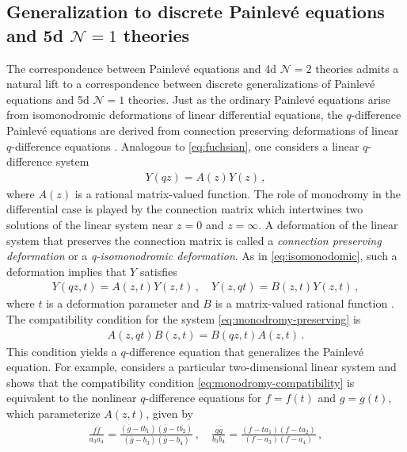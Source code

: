 \documentclass[11pt, a4paper]{article}
\theoremstyle{definition}
\begin{document}
\subsection{Generalization to discrete Painlev\'e equations and 5d \texorpdfstring{$ \mathcal{N}=1 $}{N=1} theories} \label{sec:discreteP-5d}

The correspondence between Painlev\'e equations and 4d $ \mathcal{N}=2 $ theories admits a natural lift to a correspondence between discrete generalizations of Painlev\'e equations and 5d $ \mathcal{N}=1 $ theories. Just as the ordinary Painlev\'e equations arise from isomonodromic deformations of linear differential equations, the $ q $-difference Painlev\'e equations are derived from connection preserving deformations of linear $ q $-difference equations \cite{Jimbo:1995, Murata:2008, Yamada:2008}. Analogous to \eqref{eq:fuchsian}, one considers a linear $ q $-difference system
\begin{align}
    Y(qz) = A(z) Y(z) \, ,
\end{align}
where $ A(z) $ is a rational matrix-valued function. The role of monodromy in the differential case is played by the connection matrix which intertwines two solutions of the linear system near $ z=0 $ and $ z=\infty $. A deformation of the linear system that preserves the connection matrix is called a \emph{connection preserving deformation} or a \emph{q-isomonodromic deformation}. As in \eqref{eq:isomonodomic}, such a deformation implies that $ Y $ satisfies
\begin{align}\label{eq:monodromy-preserving}
    Y(qz, t) = A(z, t) Y(z, t) \, , \quad
    Y(z, qt) = B(z, t) Y(z, t) \, ,
\end{align}
where $ t $ is a deformation parameter and $ B $ is a matrix-valued rational function \cite{Jimbo:1995}. The compatibility condition for the system \eqref{eq:monodromy-preserving} is
\begin{align}\label{eq:monodromy-compatibility}
    A(z, qt) B(z, t) = B(qz, t) A(z, t) \, .
\end{align}
This condition yields a $ q $-difference equation that generalizes the Painlev\'e equation. For example, \cite{Jimbo:1995} considers a particular two-dimensional linear system and shows that the compatibility condition \eqref{eq:monodromy-compatibility} is equivalent to the nonlinear $ q $-difference equations for $ f=f(t) $ and $ g=g(t) $, which parameterize $A(z,t)$,  given by
\begin{align}\label{eq:qVI}
    \frac{f\overline{f}}{a_3a_4} = \frac{(\overline{g}-tb_1) (\overline{g}-tb_2)}{(\overline{g}-b_3) (\overline{g}-b_4)} \, , \quad
    \frac{g\overline{g}}{b_3b_4} = \frac{(f-ta_1) (f-ta_2)}{(f-a_3) (f-a_4)} \, , 
\end{align}
\end{document}
